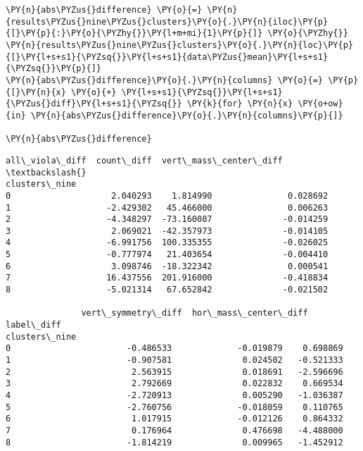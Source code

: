     \begin{tcolorbox}[breakable, size=fbox, boxrule=1pt, pad at break*=1mm,colback=cellbackground, colframe=cellborder]
\begin{Verbatim}[commandchars=\\\{\}]
\PY{n}{abs\PYZus{}difference} \PY{o}{=} \PY{n}{results\PYZus{}nine\PYZus{}clusters}\PY{o}{.}\PY{n}{iloc}\PY{p}{[}\PY{p}{:}\PY{o}{\PYZhy{}}\PY{l+m+mi}{1}\PY{p}{]} \PY{o}{\PYZhy{}} \PY{n}{results\PYZus{}nine\PYZus{}clusters}\PY{o}{.}\PY{n}{loc}\PY{p}{[}\PY{l+s+s1}{\PYZsq{}}\PY{l+s+s1}{data\PYZus{}mean}\PY{l+s+s1}{\PYZsq{}}\PY{p}{]}
\PY{n}{abs\PYZus{}difference}\PY{o}{.}\PY{n}{columns} \PY{o}{=} \PY{p}{[}\PY{n}{x} \PY{o}{+} \PY{l+s+s1}{\PYZsq{}}\PY{l+s+s1}{\PYZus{}diff}\PY{l+s+s1}{\PYZsq{}} \PY{k}{for} \PY{n}{x} \PY{o+ow}{in} \PY{n}{abs\PYZus{}difference}\PY{o}{.}\PY{n}{columns}\PY{p}{]}

\PY{n}{abs\PYZus{}difference}
\end{Verbatim}
\end{tcolorbox}

            \begin{tcolorbox}[breakable, size=fbox, boxrule=.5pt, pad at break*=1mm, opacityfill=0]
\begin{Verbatim}[commandchars=\\\{\}]
               all\_viola\_diff  count\_diff  vert\_mass\_center\_diff  \textbackslash{}
clusters\_nine
0                    2.040293    1.814990               0.028692
1                   -2.429302   45.466000               0.006263
2                   -4.348297  -73.160087              -0.014259
3                    2.069021  -42.357973              -0.014105
4                   -6.991756  100.335355              -0.026025
5                   -0.777974   21.403654              -0.004410
6                    3.098746  -18.322342               0.000541
7                   16.437556  201.916000              -0.418834
8                   -5.021314   67.652842              -0.021502

               vert\_symmetry\_diff  hor\_mass\_center\_diff  label\_diff
clusters\_nine
0                       -0.486533             -0.019879    0.698869
1                       -0.907581              0.024502   -0.521333
2                        2.563915              0.018691   -2.596696
3                        2.792669              0.022832    0.669534
4                       -2.720913              0.005290   -1.036387
5                       -2.760756             -0.018059    0.110765
6                        1.017915             -0.012126    0.864332
7                        0.176964              0.476698   -4.488000
8                       -1.814219              0.009965   -1.452912
\end{Verbatim}
\end{tcolorbox}
        
